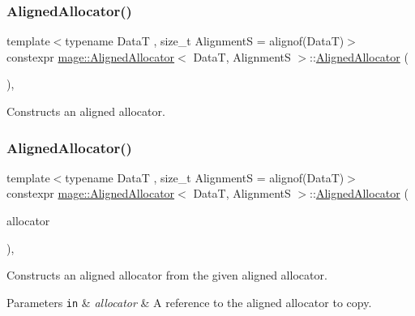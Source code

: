 \subsubsection{\texorpdfstring{Aligned\+Allocator()}{AlignedAllocator()}\hspace{0.1cm}{\footnotesize\ttfamily [1/4]}}
{\footnotesize\ttfamily template$<$typename DataT , size\+\_\+t AlignmentS = alignof(\+Data\+T)$>$ \\
constexpr \hyperlink{classmage_1_1_aligned_allocator}{mage\+::\+Aligned\+Allocator}$<$ DataT, AlignmentS $>$\+::\hyperlink{classmage_1_1_aligned_allocator}{Aligned\+Allocator} (\begin{DoxyParamCaption}{ }\end{DoxyParamCaption})\hspace{0.3cm}{\ttfamily [default]}, {\ttfamily [noexcept]}}

Constructs an aligned allocator. \hypertarget{classmage_1_1_aligned_allocator_ad5ccaa890d899f8876253a5bfd83a1ba}{}\label{classmage_1_1_aligned_allocator_ad5ccaa890d899f8876253a5bfd83a1ba} 
\subsubsection{\texorpdfstring{Aligned\+Allocator()}{AlignedAllocator()}\hspace{0.1cm}{\footnotesize\ttfamily [2/4]}}
{\footnotesize\ttfamily template$<$typename DataT , size\+\_\+t AlignmentS = alignof(\+Data\+T)$>$ \\
constexpr \hyperlink{classmage_1_1_aligned_allocator}{mage\+::\+Aligned\+Allocator}$<$ DataT, AlignmentS $>$\+::\hyperlink{classmage_1_1_aligned_allocator}{Aligned\+Allocator} (\begin{DoxyParamCaption}\item[{const \hyperlink{classmage_1_1_aligned_allocator}{Aligned\+Allocator}$<$ DataT, AlignmentS $>$ \&}]{allocator }\end{DoxyParamCaption})\hspace{0.3cm}{\ttfamily [default]}, {\ttfamily [noexcept]}}

Constructs an aligned allocator from the given aligned allocator.


\begin{DoxyParams}[1]{Parameters}
\mbox{\tt in}  & {\em allocator} & A reference to the aligned allocator to copy. \\
\hline
\end{DoxyParams}
\hypertarget{classmage_1_1_aligned_allocator_a5913d9165132c04473673dd0214e8817}{}\label{classmage_1_1_aligned_allocator_a5913d9165132c04473673dd0214e8817} 
